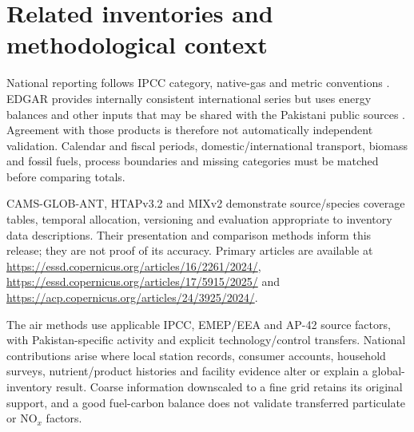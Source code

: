 \section{Related inventories and methodological context}\label{sec:related}
National reporting follows IPCC category, native-gas and metric conventions \citep{ipcc2006,ipcc2019}. EDGAR provides internally consistent international series but uses energy balances and other inputs that may be shared with the Pakistani public sources \citep{edgar2025booklet,edgarv81ap}. Agreement with those products is therefore not automatically independent validation. Calendar and fiscal periods, domestic/international transport, biomass and fossil fuels, process boundaries and missing categories must be matched before comparing totals.

CAMS-GLOB-ANT, HTAPv3.2 and MIXv2 demonstrate source/species coverage tables, temporal allocation, versioning and evaluation appropriate to inventory data descriptions. Their presentation and comparison methods inform this release; they are not proof of its accuracy. Primary articles are available at \url{https://essd.copernicus.org/articles/16/2261/2024/}, \url{https://essd.copernicus.org/articles/17/5915/2025/} and \url{https://acp.copernicus.org/articles/24/3925/2024/}.

The air methods use applicable IPCC, EMEP/EEA and AP-42 source factors, with Pakistan-specific activity and explicit technology/control transfers. National contributions arise where local station records, consumer accounts, household surveys, nutrient/product histories and facility evidence alter or explain a global-inventory result. Coarse information downscaled to a fine grid retains its original support, and a good fuel-carbon balance does not validate transferred particulate or NO$_x$ factors.
